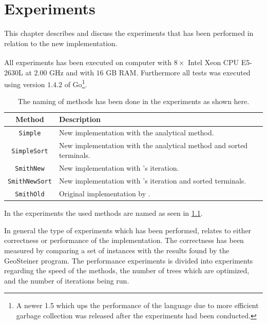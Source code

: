 {
\abnormalparskip{0pt}
\chapter{Experiments}
\label{cha:experiments}
}

This chapter describes and discuss the experiments that has been performed in
relation to the new implementation.

All experiments has been executed on computer with $8 \times$ Intel\textsuperscript{\textregistered}
Xeon\textsuperscript{\textregistered} CPU E5-2630L at $2.00$ GHz and with $16$ GB
RAM. Furthermore all tests was executed using version $1.4.2$ of Go\footnote{A newer 1.5
which ups the performance of the language due to more efficient garbage
collection was released after the experiments had been conducted.}.
%
\begin{table}[htbp]
  \centering
  \begin{tabular}{cp{9cm}}
    \toprule
    Method                & Description                                      \\
    \midrule
    \texttt{Simple}       & New implementation with the analytical method.   \\
    \texttt{SimpleSort}   & New implementation with the analytical method and sorted
                   terminals.                                                \\
    \texttt{SmithNew}     & New implementation with \citeauthor{smith1992}'s
                   iteration.                                                \\
    \texttt{SmithNewSort} & New implementation with \citeauthor{smith1992}'s iteration
                   and sorted terminals.                                     \\
    \texttt{SmithOld}     & Original implementation by \textcite{smith1992}. \\
    \bottomrule
  \end{tabular}
  \caption[Naming of methods]{The naming of methods has been done in the
    experiments as shown here.\label{tab:method-names}}
\end{table}
%
In the experiments the used methods are named as seen in
\cref{tab:method-names}.

In general the type of experiments which has been performed, relates to either
correctness or performance of the implementation. The correctness has been
measured by comparing a set of instances with the results found by the
GeoSteiner program. The performance experiments is divided into experiments
regarding the speed of the methods, the number of trees which are optimized, and
the number of iterations being run. 

